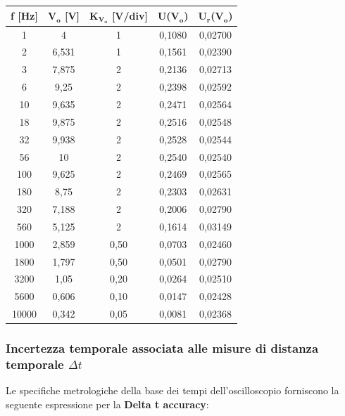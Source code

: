 \begin{table}[!ht]
    \centering
    \begin{tabular}{|c|c|c|c|c|}
    \hline

        \textbf{f [Hz]} & \textbf{$\bm{V_{o}}$ [V]} & \textbf{$\bm{K_{V_o}}$ [V/div]} & \textbf{U($\bm{V_{o}}$)} & \textbf{$\bm{U_r}$($\bm{V_{o}}$)} \\ \hline

        1 & 4 & 1 & 0,1080 & 0,02700 \\ \hline
        2 & 6,531 & 1 & 0,1561 & 0,02390 \\ \hline
        3 & 7,875 & 2 & 0,2136 & 0,02713 \\ \hline
        6 & 9,25 & 2 & 0,2398 & 0,02592 \\ \hline
        10 & 9,635 & 2 & 0,2471 & 0,02564 \\ \hline
        18 & 9,875 & 2 & 0,2516 & 0,02548 \\ \hline
        32 & 9,938 & 2 & 0,2528 & 0,02544 \\ \hline
        56 & 10 & 2 & 0,2540 & 0,02540 \\ \hline
        100 & 9,625 & 2 & 0,2469 & 0,02565 \\ \hline
        180 & 8,75 & 2 & 0,2303 & 0,02631 \\ \hline
        320 & 7,188 & 2 & 0,2006 & 0,02790 \\ \hline
        560 & 5,125 & 2 & 0,1614 & 0,03149 \\ \hline
        1000 & 2,859 & 0,50 & 0,0703 & 0,02460 \\ \hline
        1800 & 1,797 & 0,50 & 0,0501 & 0,02790 \\ \hline
        3200 & 1,05 & 0,20 & 0,0264 & 0,02510 \\ \hline
        5600 & 0,606 & 0,10 & 0,0147 & 0,02428 \\ \hline
        10000 & 0,342 & 0,05 & 0,0081 & 0,02368 \\ \hline
    \end{tabular}
\end{table}

\FloatBarrier
\clearpage


\subsubsection*{Incertezza temporale associata alle misure di distanza temporale $\Delta t$}

Le specifiche metrologiche della base dei tempi dell'oscilloscopio forniscono la seguente espressione per la \textbf{Delta t accuracy}:

